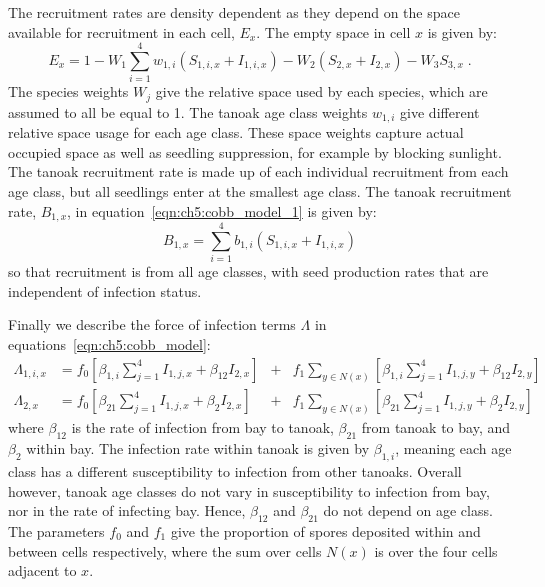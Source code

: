 The recruitment rates are density dependent as they depend on the space available for recruitment in each cell, $E_x$. The empty space in cell $x$ is given by:
\begin{equation}
    E_x = 1 - W_1\sum_{i=1}^4w_{1,i}\left(S_{1,i,x} + I_{1,i,x}\right) - W_2\left(S_{2,x} + I_{2,x}\right) - W_3S_{3,x} \;.
\end{equation}
The species weights $W_j$ give the relative space used by each species, which are assumed to all be equal to 1. The tanoak age class weights $w_{1,i}$ give different relative space usage for each age class. These space weights capture actual occupied space as well as seedling suppression, for example by blocking sunlight. The tanoak recruitment rate is made up of each individual recruitment from each age class, but all seedlings enter at the smallest age class. The tanoak recruitment rate, $B_{1,x}$, in equation~\ref{eqn:ch5:cobb_model_1} is given by:
\begin{equation}
    B_{1,x} = \sum_{i=1}^4b_{1,i}\left(S_{1,i,x} + I_{1,i,x}\right)
\end{equation}
so that recruitment is from all age classes, with seed production rates that are independent of infection status.

Finally we describe the force of infection terms $\Lambda$ in equations~\ref{eqn:ch5:cobb_model}:
\begin{subequations}\label{eqn:ch5:infection}
    \begin{alignat}{5}
        \Lambda_{1,i,x} &= f_0\left[\beta_{1,i}\sum_{j=1}^4I_{1,j,x} + \beta_{12}I_{2,x}\right] &+& f_1\sum_{y\in N(x)}\left[\beta_{1,i}\sum_{j=1}^4I_{1,j,y} + \beta_{12}I_{2,y}\right] \label{eqn:ch5:infection_1}\\
        \Lambda_{2,x} &= f_0\left[\beta_{21}\sum_{j=1}^4I_{1,j,x} + \beta_{2}I_{2,x}\right] &+& f_1\sum_{y\in N(x)}\left[\beta_{21}\sum_{j=1}^4I_{1,j,y} + \beta_{2}I_{2,y}\right] \label{eqn:ch5:infection_2}
    \end{alignat}
\end{subequations}
where $\beta_{12}$ is the rate of infection from bay to tanoak, $\beta_{21}$ from tanoak to bay, and $\beta_{2}$ within bay. The infection rate within tanoak is given by $\beta_{1,i}$, meaning each age class has a different susceptibility to infection from other tanoaks. Overall however, tanoak age classes do not vary in susceptibility to infection from bay, nor in the rate of infecting bay. Hence, $\beta_{12}$ and $\beta_{21}$ do not depend on age class. The parameters $f_0$ and $f_1$ give the proportion of spores deposited within and between cells respectively, where the sum over cells $N(x)$ is over the four cells adjacent to $x$.

